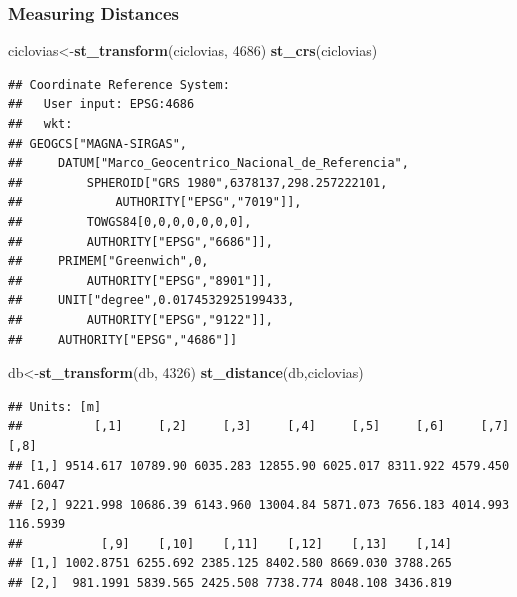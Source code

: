\documentclass[
  shownotes,
  xcolor={svgnames},
  hyperref={colorlinks,citecolor=DarkBlue,linkcolor=DarkRed,urlcolor=DarkBlue}
  ]{beamer}
\newenvironment{Shaded}{\begin{snugshade}}{\end{snugshade}}
\newcommand{\DecValTok}[1]{\textcolor[rgb]{0.00,0.00,0.81}{#1}}
\newcommand{\KeywordTok}[1]{\textcolor[rgb]{0.13,0.29,0.53}{\textbf{#1}}}
\newcommand{\NormalTok}[1]{#1}
\begin{document}
\begin{frame}[fragile]
\frametitle{Measuring Distances}

\begin{scriptsize}
\begin{Shaded}
\begin{Highlighting}[]
\NormalTok{ciclovias\textless{}{-}}\KeywordTok{st\_transform}\NormalTok{(ciclovias, }\DecValTok{4686}\NormalTok{)}
\KeywordTok{st\_crs}\NormalTok{(ciclovias)}
\end{Highlighting}
\end{Shaded}
\begin{tiny}
\begin{verbatim}
## Coordinate Reference System:
##   User input: EPSG:4686 
##   wkt:
## GEOGCS["MAGNA-SIRGAS",
##     DATUM["Marco_Geocentrico_Nacional_de_Referencia",
##         SPHEROID["GRS 1980",6378137,298.257222101,
##             AUTHORITY["EPSG","7019"]],
##         TOWGS84[0,0,0,0,0,0,0],
##         AUTHORITY["EPSG","6686"]],
##     PRIMEM["Greenwich",0,
##         AUTHORITY["EPSG","8901"]],
##     UNIT["degree",0.0174532925199433,
##         AUTHORITY["EPSG","9122"]],
##     AUTHORITY["EPSG","4686"]]
\end{verbatim}
\end{tiny}
\begin{Shaded}
\begin{Highlighting}[]
\NormalTok{db\textless{}{-}}\KeywordTok{st\_transform}\NormalTok{(db, }\DecValTok{4326}\NormalTok{)}
\KeywordTok{st\_distance}\NormalTok{(db,ciclovias)}
\end{Highlighting}
\end{Shaded}

\begin{verbatim}
## Units: [m]
##          [,1]     [,2]     [,3]     [,4]     [,5]     [,6]     [,7]     [,8]
## [1,] 9514.617 10789.90 6035.283 12855.90 6025.017 8311.922 4579.450 741.6047
## [2,] 9221.998 10686.39 6143.960 13004.84 5871.073 7656.183 4014.993 116.5939
##           [,9]    [,10]    [,11]    [,12]    [,13]    [,14]
## [1,] 1002.8751 6255.692 2385.125 8402.580 8669.030 3788.265
## [2,]  981.1991 5839.565 2425.508 7738.774 8048.108 3436.819
\end{verbatim}
\end{scriptsize}
\end{frame}
\end{document}

